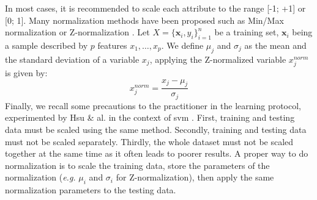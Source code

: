 In most cases, it is recommended to scale each attribute to the range [-1; +1] or [0; 1]. Many normalization methods have been proposed such as Min/Max normalization or Z-normalization \cite{Mohamad2013}. Let $X=\{\textbf{x}_i,y_i\}_{i=1}^n$ be a training set, $\textbf{x}_i$ being a sample described by $p$ features $x_1, \ldots, x_p$. We define $\mu_j$ and $\sigma_j$ as the mean and the standard deviation of a variable $x_j$, applying the Z-normalized variable $x^{norm}_j$ is given by:
\begin{equation}
x^{norm}_j = \frac{x_j-\mu_j}{\sigma_j}
\end{equation}
%
%
Finally, we recall some precautions to the practitioner in the learning protocol, experimented by Hsu \& al. in the context of {\sc svm} \cite{Hsu2008}. First, training and testing data must be scaled using the same method. Secondly, training and testing data must not be scaled separately. Thirdly, the whole dataset must not be scaled together at the same time as it often leads to poorer results. A proper way to do normalization is to scale the training data, store the parameters of the normalization (\textit{e.g.} $\mu_i$ and $\sigma_i$ for Z-normalization), then apply the same normalization parameters to the testing data. 


